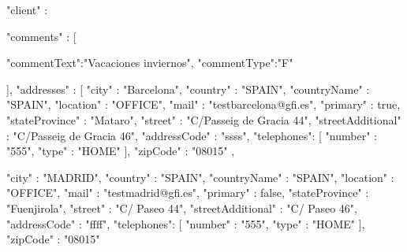 	{

               
                "client" : {
                   "comments" : [{
                                                               "commentText":"Vacaciones inviernos",
                "commentType":"F"

              }
                               ],
                               "addresses" : [{
                                                               "city" : "Barcelona",
                                                               "country" : "SPAIN",
                                                               "countryName" : "SPAIN",
                                                               "location" : "OFFICE",
                                                               "mail" : "testbarcelona@gfi.es",
                                                               "primary" : true,
                                                               "stateProvince" : "Mataro",
                                                               "street" : "C/Passeig de Gracia 44",
                                                               "streetAdditional" : "C/Passeig de Gracia 46",
                                                               "addressCode" : "ssss",
                                                               "telephones": [{
                                                                               "number" : "555",
                                "type" : "HOME"            
                                                                                                                }],                                                       
                                                               "zipCode" : "08015"
                                               }, {

                                                               "city" : "MADRID",
                                                               "country" : "SPAIN",
                                                               "countryName" : "SPAIN",
                                                               "location" : "OFFICE",
                                                               "mail" : "testmadrid@gfi.es",
                                                               "primary" : false,
                                                               "stateProvince" : "Fuenjirola",
                                                               "street" : "C/ Paseo 44",
                                                               "streetAdditional" : "C/ Paseo 46",
                                                               "addressCode" : "ffff",
                                                               "telephones": [{
                                                                               "number" : "555",
                                "type" : "HOME"            
                                                                                                                }],                                                                                                                      
                                                               "zipCode" : "08015"

}}}
